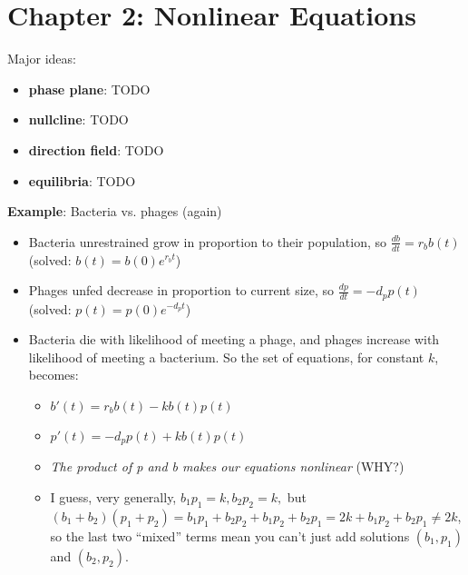 \documentclass[11pt, oneside]{article}   	%
\begin{document}
\section{Chapter 2: Nonlinear Equations}

Major ideas:
\begin{itemize}
\item \textbf{phase plane}: TODO
\item \textbf{nullcline}: TODO
\item \textbf{direction field}: TODO
\item \textbf{equilibria}: TODO
\end{itemize}
 
\textbf{Example}: Bacteria vs. phages (again)
\begin{itemize}
\item Bacteria unrestrained grow in proportion to their population, so $\frac{db}{dt} = r_b b(t)$ (solved: $b(t) = b(0)e^{r_b t}$)
\item Phages unfed decrease in proportion to current size, so $\frac{dp}{dt} = -d_p p(t)$  (solved: $p(t) = p(0)e^{-d_p t}$)
\item Bacteria die with likelihood of meeting a phage, and phages increase with likelihood of meeting a bacterium.  So the set of equations, for constant $k$, becomes:
\begin{itemize}
\item $b'(t) = r_b b(t) - kb(t)p(t)$
\item $p'(t) = -d_p p(t) + kb(t)p(t)$
\item \emph{The product of p and b makes our equations nonlinear} (WHY?)
\item I guess, very generally, $b_1p_1 = k, b_2p_2 = k,$ but $(b_1+b_2)(p_1+p_2) = b_1p_1 + b_2p_2 + b_1p_2+b_2p_1 = 2k + b_1p_2+b_2p_1 \neq 2k$, so the last two ``mixed'' terms mean you can't just add solutions $(b_1, p_1)$ and  $(b_2, p_2)$.
\end{itemize}
\end{itemize}
\end{document}

